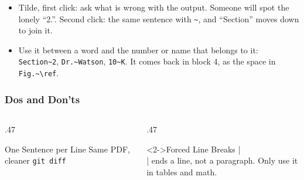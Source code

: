 \begin{frame}[fragile]
{\begin{itemize}
                Useful in tables and macros.
            \item Tilde, first click: ask what is wrong with the output.
                Someone will spot the lonely ``2.''.
                Second click: the same sentence with \texttt{\textasciitilde}, and ``Section'' moves down to join it.
            \item Use it between a word and the number or name that belongs to it:
                \texttt{Section\textasciitilde 2}, \texttt{Dr.\textasciitilde Watson}, \texttt{10\textasciitilde K}.
                It comes back in block 4, as the space in \texttt{Fig.\textasciitilde\textbackslash ref}.
        \end{itemize}
    }
\end{frame}

\begin{frame}[fragile]
    \frametitle{Dos and Don'ts}
    \begin{columns}[T, onlytextwidth]
        \begin{column}{.47\textwidth}
            \begin{exampleblock}{One Sentence per Line}
                Same PDF, cleaner \texttt{git diff}
            \end{exampleblock}
        \end{column}
        \begin{column}{.47\textwidth}
            \begin{alertblock}<2->{Forced Line Breaks}
                \code|\\| ends a line, not a paragraph.
                Only use it in tables and math.
            \end{alertblock}
        \end{column}
    \end{columns}
\end{frame}

